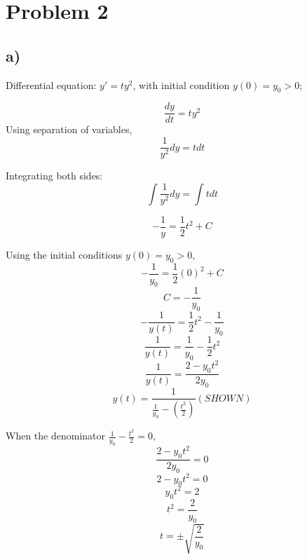 \documentclass{article}
\begin{document}
\section{Problem 2}
\subsection*{a)}
Differential equation: $y'=ty^2$, with initial condition $y(0)=y_0 >0$;

\begin{equation*}
   \frac{dy}{dt}=ty^2
\end{equation*}
Using separation of variables, 
\begin{equation*}
    \frac{1}{y^2}dy= tdt
\end{equation*}

Integrating both sides:
\begin{equation*}
    \int\frac{1}{y^2}dy=\int tdt
\end{equation*}

\begin{equation*}
    -\frac{1}{y}=\frac{1}{2}t^2 + C
\end{equation*}

Using the initial conditions $y(0)=y_0>0$,
\begin{equation*}
    -\frac{1}{y_0}=\frac{1}{2}(0)^2+C
\end{equation*}
\begin{equation*}
    C= -\frac{1}{y_0}
\end{equation*}
\begin{equation*}
    -\frac{1}{y(t)}=\frac{1}{2}t^2-\frac{1}{y_0}
\end{equation*}
\begin{equation*}
    \frac{1}{y(t)}=\frac{1}{y_0}-\frac{1}{2}t^2
\end{equation*}
\begin{equation*}
    \frac{1}{y(t)}=\frac{2-y_0t^2}{2y_0}
\end{equation*}
\begin{equation*}
    y(t)=\frac{1}{\frac{1}{y_0}-\left(\frac{t^2}{2}\right)} (SHOWN)
\end{equation*}

When the denominator $\frac{1}{y_0}-\frac{t^2}{2}=0$,
\begin{equation*}
    \frac{2-y_0t^2}{2y_0}=0
\end{equation*}
\begin{equation*}
    2-y_0t^2=0
\end{equation*}
\begin{equation*}
    y_0t^2=2
\end{equation*}
\begin{equation*}
    t^2=\frac{2}{y_0}
\end{equation*}
\begin{equation*}
    t=\pm{\sqrt{\frac{2}{y_0}}}
\end{equation*}
\end{document}
